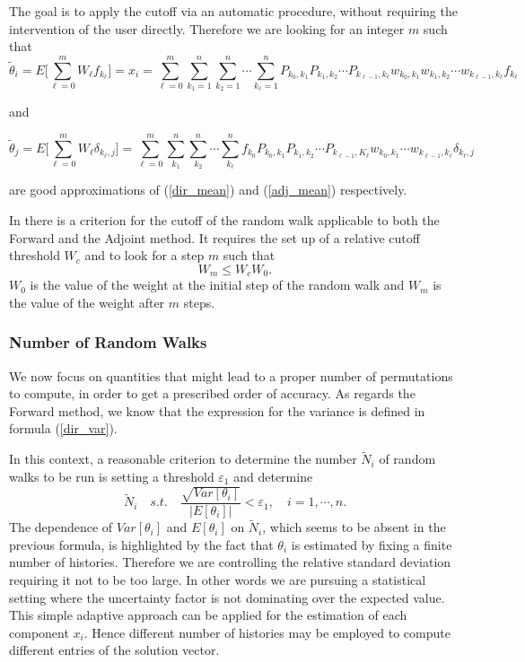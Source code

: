\documentclass[a4paper,10pt]{article}
\begin{document}
The goal is to apply the cutoff via an automatic procedure, without requiring
the intervention of the user directly.
Therefore we are looking for an integer $m$ such that
\[
\tilde{\theta}_i=E\bigg[\sum_{\ell=0}^m W_{\ell}
f_{k_{\ell}}\bigg]=x_i=\sum_{\ell=0}^m
\sum_{k_1=1}^{n}\sum_{k_2=1}^n\cdots \sum_{k_{\ell}=1}^n
P_{k_0,k_1}P_{k_1,k_2}\cdots P_{k_{\ell-1},
k_{\ell}}w_{k_0,k_1}w_{k_1,k_2}\cdots
w_{k_{\ell-1}, k_{\ell}}f_{k_{\ell}}
\]

and

\[
\tilde{\theta}_j=E\bigg[\sum_{\ell=0}^m W_{\ell}\delta_{k_{\ell},
j}\bigg]=\sum_{\ell=0}^{m}\sum_{k_1}^n\sum_{k_2}^n\cdots\sum_{k_{\ell}}^n
f_{k_0}P_{k_0,k_1}P_{k_1,k_2}\cdots P_{k_{\ell-1},K_{\ell}}w_{k_0,k_1}\cdots
w_{k_{\ell-1},k_{\ell}}\delta_{k_{\ell},j}
\]

are good approximations of (\ref{dir_mean}) and (\ref{adj_mean}) respectively.


In \cite{Slattery2013} there is a criterion for the cutoff of the random walk
applicable to both the Forward and the Adjoint method. It requires the set up
of a relative cutoff threshold $W_c$ and to look for a step $m$ such that
\begin{equation}
W_m \le W_c W_0.
\label{cutoff}
\end{equation}
$W_0$ is the value of the weight at the initial step of the random walk and
$W_m$ is the value of the weight after $m$ steps.

\subsubsection{Number of Random Walks}

We now focus on quantities that might lead to a proper
number of permutations to compute, in order to get a prescribed order of
accuracy.
As regards the Forward method, we know that the expression for the variance
is defined in formula (\ref{dir_var}).

In this context, a reasonable criterion to determine the number $\tilde{N}_i$
of random walks to be run is setting a threshold $\varepsilon_1$ and determine
\begin{equation}
\tilde{N}_i \quad s.t.\quad \frac{\sqrt{Var[\theta_i]}}{\lvert
E[\theta_i]\rvert}<\varepsilon_1, \quad i=1,\cdots,n.
\label{forward_adapt}
\end{equation}
The dependence of $Var[\theta_i]$ and $E[\theta_i]$ on $\tilde{N}_i$, which
seems
to be absent in the previous formula, is highlighted by the fact that
$\theta_i$
is estimated by fixing a finite number of histories.
Therefore we are controlling the relative standard deviation requiring it not
to be too large. In other words we are pursuing a statistical setting where the
uncertainty factor is not dominating over the expected value.
This simple adaptive approach can be applied for the estimation of each
component $x_i$. Hence different number of histories may be employed to
compute different entries of the solution vector. \newline
\end{document}
